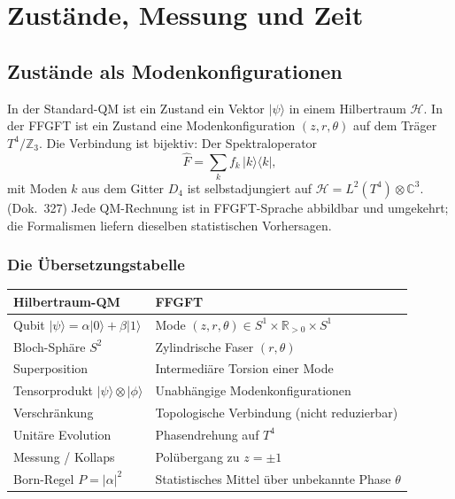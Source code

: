 \chapter{Zustände, Messung und Zeit}
\label{ch:zustand}

\section{Zustände als Modenkonfigurationen}

In der Standard-QM ist ein Zustand ein Vektor $|\psi\rangle$ in einem
Hilbertraum $\mathcal{H}$. In der FFGFT ist ein Zustand eine
Modenkonfiguration $(z, r, \theta)$ auf dem Träger $T^4/\mathbb{Z}_3$.
Die Verbindung ist bijektiv: Der Spektraloperator
\begin{equation}
  \hat F = \sum_k f_k\, |k\rangle\langle k|,
  \label{eq:spektral}
\end{equation}
mit Moden $k$ aus dem Gitter $D_4$ ist selbstadjungiert auf
$\mathcal{H} = L^2(T^4)\otimes\mathbb{C}^3$. (Dok.~327)
Jede QM-Rechnung ist in FFGFT-Sprache abbildbar und umgekehrt;
die Formalismen liefern dieselben statistischen Vorhersagen.

\subsection{Die Übersetzungstabelle}

\begin{center}
\small\renewcommand{\arraystretch}{1.25}
\begin{tabular}{p{3.4cm}p{4.2cm}}
\toprule
Hilbertraum-QM & FFGFT \\
\midrule
Qubit $|\psi\rangle = \alpha|0\rangle+\beta|1\rangle$ & Mode $(z,r,\theta)\in S^1\times\mathbb{R}_{>0}\times S^1$ \\
Bloch-Sphäre $S^2$ & Zylindrische Faser $(r,\theta)$ \\
Superposition & Intermediäre Torsion einer Mode \\
Tensorprodukt $|\psi\rangle\otimes|\phi\rangle$ & Unabhängige Modenkonfigurationen \\
Verschränkung & Topologische Verbindung (nicht reduzierbar) \\
Unitäre Evolution & Phasendrehung auf $T^4$ \\
Messung / Kollaps & Polübergang zu $z=\pm1$ \\
Born-Regel $P=|\alpha|^2$ & Statistisches Mittel über unbekannte Phase $\theta$ \\
\bottomrule
\end{tabular}
\end{center}

